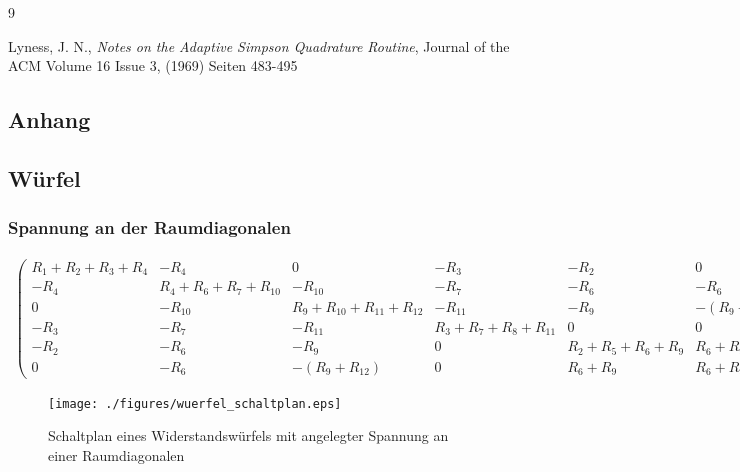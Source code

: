 \documentclass[10pt,a4paper]{article}
\begin{document}
\begin{thebibliography}{9}

 Lyness, J. N.,
 \emph{Notes on the Adaptive Simpson Quadrature Routine},
Journal of the ACM
Volume 16 Issue 3, (1969) 
Seiten 483-495 

\end{thebibliography}
\newpage
\begin{landscape}
\thispagestyle{empty}
\appendix
\section{Anhang}
\subsection{Würfel}

\subsubsection{Spannung an der Raumdiagonalen}
\begin{align}
\begin{pmatrix}
R_1+R_2+R_3+R_4 &  -R_4  &  0  &  -R_3  &  -R_2  &  0  \\ 
-R_4 & R_4+R_6+R_7+R_{10} & -R_{10} & -R_7 & -R_6 & -R_6 \\ 
 0  & -R_{10} & R_9+R_{10}+R_{11}+R_{12} & -R_{11} & -R_9 & -(R_9+R_{12}) \\ 
-R_3 & -R_7 & -R_11 & R_3+R_7+R_8+R_{11} & 0 & 0 \\ 
-R_2 & -R_6 & -R_9 & 0 & R_2+R_5+R_6+R_9 & R_6+R_9 \\ 
 0  & -R_6 & -(R_9+R_{12}) &  0  & R_6+R_9 & R_6+R_9+R_{12}
\end{pmatrix}
\begin{pmatrix}
I_1\\I_2\\I_3\\I_4\\I_5\\I_{ges}
\end{pmatrix}
=
\begin{pmatrix}
0\\0\\0\\0\\0\\U
\end{pmatrix}
\label{eqn:wuerfel_ganz}
\end{align}

\begin{figure}[htbp!]
\centering
\texttt{[image: ./figures/wuerfel\_schaltplan.eps]}
\caption{Schaltplan eines Widerstandswürfels mit angelegter Spannung an einer Raumdiagonalen}
\label{fig:wuerfel_schaltplan}
\end{figure}


\end{landscape}
\end{document}
